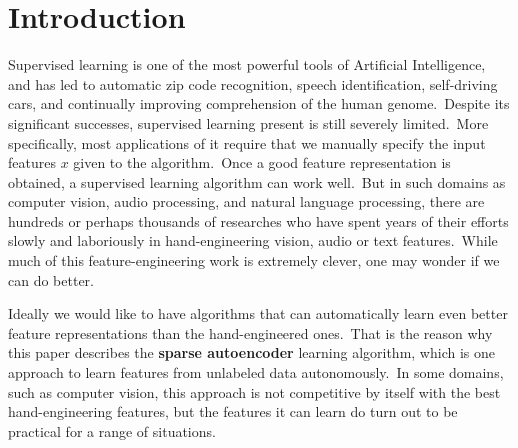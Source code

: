 \section{Introduction}
Supervised learning is one of the most powerful tools of Artificial Intelligence, and has led to automatic zip code recognition, speech identification, self-driving cars, and continually improving comprehension of the human genome.~Despite its significant successes, supervised learning present is still severely limited.~More specifically, most applications of it require that we manually specify the input features $x$ given to the algorithm.~Once a good feature representation is obtained, a supervised learning algorithm can work well.~But in such domains as computer vision, audio processing, and natural language processing, there are hundreds or perhaps thousands of researches who have spent years of their efforts slowly and laboriously in hand-engineering vision, audio or text features.~While much of this feature-engineering work is extremely clever, one may wonder if we can do better.

Ideally we would like to have algorithms that can automatically learn even better feature representations than the hand-engineered ones.~That is the reason why this paper describes the \textbf{sparse autoencoder} learning algorithm, which is one approach to learn features from unlabeled data autonomously.~In some domains, such as computer vision, this approach is not competitive by itself with the best hand-engineering features, but the features it can learn do turn out to be practical for a range of situations.